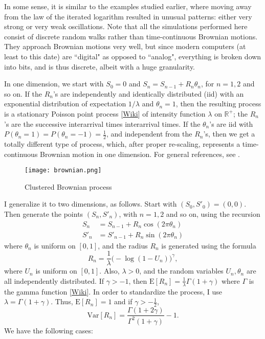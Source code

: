 \documentclass[oneside,10pt]{book}
\begin{document}
In some sense, it is similar to the examples studied earlier, where moving away from the law of the iterated logarithm resulted in unusual patterns: either very strong or very weak oscillations. Note that all the simulations performed here consist of discrete random walks rather than
 time-continuous Brownian motions.
 They approach Brownian motions very well, but since modern computers (at least to this date) are ``digital" as opposed to ``analog", everything is broken down into bits, and is thus discrete, albeit with a huge granularity.

  In one dimension, we start with $S_0=0$ and $S_n=S_{n-1}+R_n\theta_n$, for $n=1,2$ and so on. If the $R_n$'s are independently and identically distributed (iid) with an exponential distribution of expectation $1/\lambda$ and $\theta_n=1$, then the resulting process is a stationary
\textcolor{index}{Poisson point process} [\href{https://en.wikipedia.org/wiki/Poisson_point_process}{Wiki}] of
intensity function $\lambda$ on $\mathbb{R}^{+}$; the $R_n$'s are the successive
interarrival times \textcolor{index}{interarrival times}. If the $\theta_n$'s are iid with $P(\theta_n=1)=P(\theta_n=-1)=\frac{1}{2}$, and independent from the $R_n$'s, then we get a totally different type of process, which, after proper re-scaling, represents a time-continuous
 \textcolor{index}{Brownian motion} in one dimension. For general references, see \cite{daleyA2002,daleyB2008}.


\begin{figure}%
\centering
\texttt{[image: brownian.png]}
\caption{Clustered Brownian process}
\label{fig:lolbrown}
\end{figure}

I generalize it to two dimensions, as follows. Start with $(S_0,S'_0)=(0,0)$. Then generate the points $(S_n, S'_n)$, with $n=1,2$ and so on, using the recursion
\begin{align}
S_n &  =  S_{n-1}+R_n \cos(2\pi\theta_n) \label{brown10} \\
S'_n & = S'_{n-1}+ R_n\sin(2\pi\theta_n) \label{brown11}
\end{align}
where $\theta_n$ is uniform on $[0, 1]$, and the radius $R_n$ is generated using the formula
\begin{equation}
R_n=\frac{1}{\lambda}\Big(-\log(1-U_n)\Big)^\gamma, \label{gam11}
\end{equation}
where $U_n$ is uniform on $[0,1]$. Also, $\lambda>0$, and the random variables $U_n,\theta_n$ are all independently distributed. If $\gamma>-1$, then
$\mbox{E}[R_n]=\frac{1}{\lambda}\Gamma(1+\gamma)$ where $\Gamma$ is the \textcolor{index}{gamma function}
[\href{https://en.wikipedia.org/wiki/Gamma_function}{Wiki}]. In order to standardize the process, I use
$\lambda=\Gamma(1+\gamma)$. Thus, $\mbox{E}[R_n]=1$ and if $\gamma>-\frac{1}{2}$,
$$\mbox{Var}[R_n]=\frac{\Gamma(1+2\gamma)}{\Gamma^2(1+\gamma)}-1.$$
We have the following cases:
\end{document}
